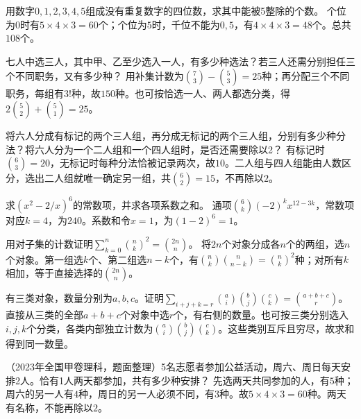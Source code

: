 用数字\(0,1,2,3,4,5\)组成没有重复数字的四位数，求其中能被5整除的个数。
\solutionanswer
个位为\(0\)时有\(5\times4\times3=60\)个；个位为\(5\)时，千位不能为\(0,5\)，有\(4\times4\times3=48\)个。总共\(108\)个。


七人中选三人，其中甲、乙至少选入一人，有多少种选法？若三人还需分别担任三个不同职务，又有多少种？
\solutionanswer
用补集计数为\(\binom73-\binom53=25\)种；再分配三个不同职务，每组有\(3!\)种，故\(150\)种。也可按恰选一人、两人都选分类，得\(2\binom52+\binom51=25\)。


将六人分成有标记的两个三人组，再分成无标记的两个三人组，分别有多少种分法？将六人分为一个二人组和一个四人组时，是否还需要除以2？
\solutionanswer
有标记时\(\binom63=20\)，无标记时每种分法恰被记录两次，故\(10\)。二人组与四人组能由人数区分，选出二人组就唯一确定另一组，共\(\binom62=15\)，不再除以\(2\)。


求\((x^2-2/x)^6\)的常数项，并求各项系数之和。
\solutionanswer
通项\(\binom6k(-2)^kx^{12-3k}\)，常数项对应\(k=4\)，为\(240\)。系数和令\(x=1\)，为\((1-2)^6=1\)。


用对子集的计数证明\(\sum_{k=0}^n\binom nk^2=\binom{2n}n\)。
\solutionanswer
将\(2n\)个对象分成各\(n\)个的两组，选\(n\)个对象。第一组选\(k\)个、第二组选\(n-k\)个，有\(\binom nk\binom n{n-k}=\binom nk^2\)种；对所有\(k\)相加，等于直接选择的\(\binom{2n}n\)。


有三类对象，数量分别为\(a,b,c\)。证明\(\sum_{i+j+k=r}\binom ai\binom bj\binom ck=\binom{a+b+c}r\)。
\solutionanswer
直接从三类的全部\(a+b+c\)个对象中选\(r\)个，有右侧的数量。也可按三类分别选入\(i,j,k\)个分类，各类内部独立计数为\(\binom ai\binom bj\binom ck\)。这些类别互斥且穷尽，故求和得到同一数量。


（2023年全国甲卷理科，题面整理）5名志愿者参加公益活动，周六、周日每天安排2人。恰有1人两天都参加，共有多少种安排？
\solutionanswer
先选两天共同参加的人，有\(5\)种；周六的另一人有\(4\)种，周日的另一人必须不同，有\(3\)种。故\(5\times4\times3=60\)种。两天有名称，不能再除以\(2\)。


